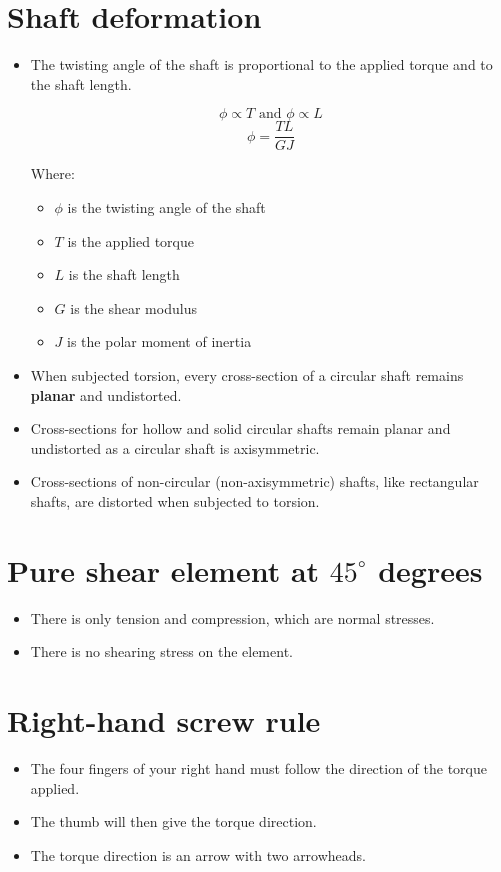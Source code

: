 \documentclass[11pt]{article}
\begin{document}
\section{Shaft deformation}
\label{sec:org321addd}
\begin{itemize}
\item The twisting angle of the shaft is proportional to the applied torque and to the shaft length.

\[\phi \propto T \text{ and } \phi \propto L\]
\[\phi = \frac{TL}{GJ}\]

Where:
\begin{itemize}
\item \(\phi\) is the twisting angle of the shaft
\item \(T\) is the applied torque
\item \(L\) is the shaft length
\item \(G\) is the shear modulus
\item \(J\) is the polar moment of inertia
\end{itemize}

\item When subjected torsion, every cross-section of a circular shaft remains \textbf{planar} and undistorted.
\item Cross-sections for hollow and solid circular shafts remain planar and undistorted as a circular shaft is axisymmetric.
\item Cross-sections of non-circular (non-axisymmetric) shafts, like rectangular shafts, are distorted when subjected to torsion.
\end{itemize}
\section{Pure shear element at \(45^{\circ}\) degrees}
\label{sec:org1b78dce}
\begin{itemize}
\item There is only tension and compression, which are normal stresses.
\item There is no shearing stress on the element.
\end{itemize}

\newpage
\section{Right-hand screw rule}
\label{sec:org1fd5c67}
\begin{itemize}
\item The four fingers of your right hand must follow the direction of the torque applied.
\item The thumb will then give the torque direction.
\item The torque direction is an arrow with two arrowheads.
\end{itemize}
\end{document}
